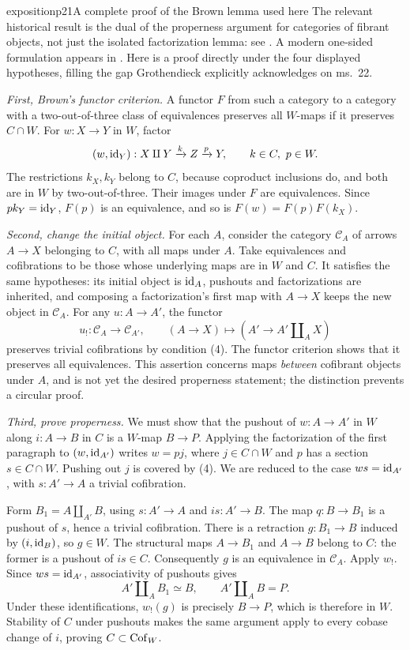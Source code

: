 \begin{dcomment}{exposition}{p21}{A complete proof of the Brown lemma used here}
The relevant historical result is the dual of the properness argument for categories of fibrant objects, not just the isolated factorization lemma: see \citet[Part I, \S1, pp.~420--422, and \S4, Lemmas 1--2, pp.~428--429]{Brown1973}. A modern one-sided formulation appears in \citet[\S\S1.3--1.4]{RadulescuBanu2009}. Here is a proof directly under the four displayed hypotheses, filling the gap Grothendieck explicitly acknowledges on ms.~22.

\emph{First, Brown's functor criterion.} A functor $F$ from such a category to a category with a two-out-of-three class of equivalences preserves all $W$-maps if it preserves $C\cap W$. For $w:X\to Y$ in $W$, factor
\[
(w,\mathrm{id}_Y):X\amalg Y\xrightarrow{k} Z\xrightarrow{p}Y,
\qquad k\in C,\ p\in W.
\]
The restrictions $k_X,k_Y$ belong to $C$, because coproduct inclusions do, and both are in $W$ by two-out-of-three. Their images under $F$ are equivalences. Since $pk_Y=\mathrm{id}_Y$, $F(p)$ is an equivalence, and so is $F(w)=F(p)F(k_X)$.

\emph{Second, change the initial object.} For each $A$, consider the category $\mathcal C_A$ of arrows $A\to X$ belonging to $C$, with all maps under $A$. Take equivalences and cofibrations to be those whose underlying maps are in $W$ and $C$. It satisfies the same hypotheses: its initial object is $\mathrm{id}_A$, pushouts and factorizations are inherited, and composing a factorization's first map with $A\to X$ keeps the new object in $\mathcal C_A$. For any $u:A\to A'$, the functor
\[
u_!: \mathcal C_A\longrightarrow\mathcal C_{A'},
\qquad (A\to X)\longmapsto(A'\to A'\amalg_A X)
\]
preserves trivial cofibrations by condition (4). The functor criterion shows that it preserves all equivalences. This assertion concerns maps \emph{between} cofibrant objects under $A$, and is not yet the desired properness statement; the distinction prevents a circular proof.

\emph{Third, prove properness.} We must show that the pushout of $w:A\to A'$ in $W$ along $i:A\to B$ in $C$ is a $W$-map $B\to P$. Applying the factorization of the first paragraph to $(w,\mathrm{id}_{A'})$ writes $w=pj$, where $j\in C\cap W$ and $p$ has a section $s\in C\cap W$. Pushing out $j$ is covered by (4). We are reduced to the case $ws=\mathrm{id}_{A'}$, with $s:A'\to A$ a trivial cofibration.

Form $B_1=A\amalg_{A'}B$, using $s:A'\to A$ and $is:A'\to B$. The map $q:B\to B_1$ is a pushout of $s$, hence a trivial cofibration. There is a retraction $g:B_1\to B$ induced by $(i,\mathrm{id}_B)$, so $g\in W$. The structural maps $A\to B_1$ and $A\to B$ belong to $C$: the former is a pushout of $is\in C$. Consequently $g$ is an equivalence in $\mathcal C_A$. Apply $w_!$. Since $ws=\mathrm{id}_{A'}$, associativity of pushouts gives
\[
A'\amalg_A B_1\simeq B,
\qquad A'\amalg_A B=P.
\]
Under these identifications, $w_!(g)$ is precisely $B\to P$, which is therefore in $W$. Stability of $C$ under pushouts makes the same argument apply to every cobase change of $i$, proving $C\subset\mathrm{Cof}_W$.


\end{dcomment}
